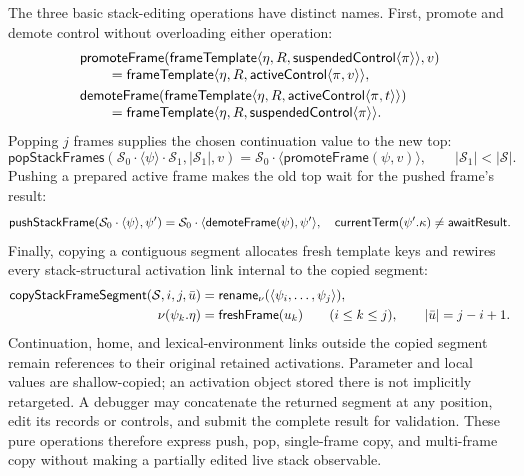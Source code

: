 The three basic stack-editing operations have distinct names.  First, promote
and demote control without overloading either operation:
\begin{equation}\label{eq:promote-demote-frame-control}
\begin{aligned}
 &\mathsf{promoteFrame}(\mathsf{frameTemplate}\langle
      \eta,R,\mathsf{suspendedControl}\langle\pi\rangle\rangle,v)
   \\[-1mm]&\qquad={}\mathsf{frameTemplate}\langle
      \eta,R,\mathsf{activeControl}\langle\pi,v\rangle\rangle,\\
 &\mathsf{demoteFrame}(\mathsf{frameTemplate}\langle
      \eta,R,\mathsf{activeControl}\langle\pi,t\rangle\rangle)
   \\[-1mm]&\qquad={}\mathsf{frameTemplate}\langle
      \eta,R,\mathsf{suspendedControl}\langle\pi\rangle\rangle.
\end{aligned}
\end{equation}
Popping $j$ frames supplies the chosen continuation value to the new top:
\begin{equation}\label{eq:pop-stack-frames}
 \mathsf{popStackFrames}
   (\mathcal S_0\cdot\langle\psi\rangle\cdot\mathcal S_1,
      |\mathcal S_1|,v)
 =\mathcal S_0\cdot\langle\mathsf{promoteFrame}(\psi,v)\rangle,
 \qquad |\mathcal S_1|<|\mathcal S|.
\end{equation}
Pushing a prepared active frame makes the old top wait for the pushed frame's
result:
\begin{equation}\label{eq:push-stack-frame}
 \mathsf{pushStackFrame}
  (\mathcal S_0\cdot\langle\psi\rangle,\psi')
 =\mathcal S_0\cdot\langle\mathsf{demoteFrame}(\psi),\psi'\rangle,
 \quad
 \mathsf{currentTerm}(\psi'.\kappa)\ne\mathsf{awaitResult}.
\end{equation}
Finally, copying a contiguous segment allocates fresh template keys and rewires
every stack-structural activation link internal to the copied segment:
\begin{equation}\label{eq:copy-stack-frame-segment}
\begin{aligned}
 \mathsf{copyStackFrameSegment}(\mathcal S,i,j,\bar u)
   &=\mathsf{rename}_{\nu}
       (\langle\psi_i,\ldots,\psi_j\rangle),\\
 \nu(\psi_k.\eta)&=\mathsf{freshFrame}(u_k)\qquad(i\le k\le j),
 \qquad |\bar u|=j-i+1.
\end{aligned}
\end{equation}
Continuation, home, and lexical-environment links outside the copied segment
remain references to their original retained activations.  Parameter and local
values are shallow-copied; an activation object stored there is not implicitly
retargeted.  A debugger may concatenate the returned segment at any position,
edit its records or controls, and submit the complete result for validation.
These pure operations therefore express push, pop, single-frame copy, and
multi-frame copy without making a partially edited live stack observable.

